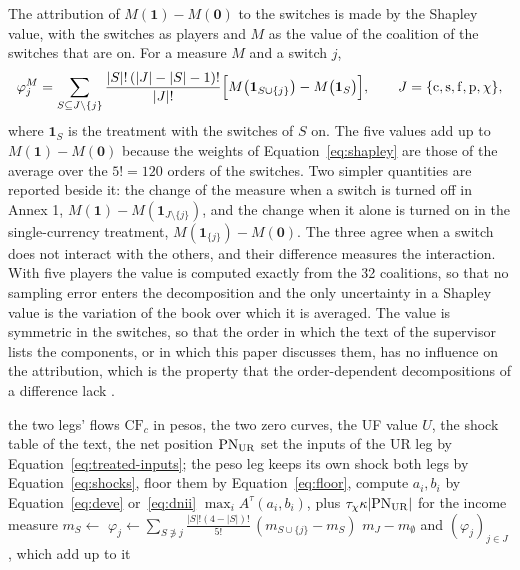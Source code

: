 The attribution of $M(\mathbf 1)-M(\mathbf 0)$ to the switches is made by the Shapley value, with the switches as players and $M$ as the value of the coalition of the switches that are on. For a measure $M$ and a switch $j$,
\begin{equation}
\varphi_j^{M}=\sum_{S\subseteq J\setminus\{j\}}\frac{|S|!\,(|J|-|S|-1)!}{|J|!}\Bigl[M\bigl(\mathbf 1_{S\cup\{j\}}\bigr)-M\bigl(\mathbf 1_{S}\bigr)\Bigr],\qquad J=\{\mathrm{c},\mathrm{s},\mathrm{f},\mathrm{p},\chi\},
\label{eq:shapley}
\end{equation}
where $\mathbf 1_S$ is the treatment with the switches of $S$ on. The five values add up to $M(\mathbf 1)-M(\mathbf 0)$ because the weights of Equation~\eqref{eq:shapley} are those of the average over the $5!=120$ orders of the switches. Two simpler quantities are reported beside it: the change of the measure when a switch is turned off in Annex 1, $M(\mathbf 1)-M(\mathbf 1_{J\setminus\{j\}})$, and the change when it alone is turned on in the single-currency treatment, $M(\mathbf 1_{\{j\}})-M(\mathbf 0)$. The three agree when a switch does not interact with the others, and their difference measures the interaction. With five players the value is computed exactly from the 32 coalitions, so that no sampling error enters the decomposition and the only uncertainty in a Shapley value is the variation of the book over which it is averaged. The value is symmetric in the switches, so that the order in which the text of the supervisor lists the components, or in which this paper discusses them, has no influence on the attribution, which is the property that the order-dependent decompositions of a difference lack \citep{Oaxaca1973}.

\begin{algorithm}[htbp]
\caption{The measure of a book under a treatment $\tau$, and the exact Shapley decomposition of the difference between Annex 1 and the single currency.}
\label{alg:shapley}
\begin{algorithmic}[1]
\Require the two legs' flows $\mathrm{CF}_c$ in pesos, the two zero curves, the UF value $U$, the shock table of the text, the net position $\mathrm{PN}_{\mathrm{UR}}$
  \State set the inputs of the UR leg by Equation~\eqref{eq:treated-inputs}; the peso leg keeps its own
    \State shock both legs by Equation~\eqref{eq:shocks}, floor them by Equation~\eqref{eq:floor}, compute $a_i,b_i$ by Equation~\eqref{eq:deve} or~\eqref{eq:dnii}
  \EndFor
  \State \Return $\max_i A^{\tau}(a_i,b_i)$, plus $\tau_\chi\kappa|\mathrm{PN}_{\mathrm{UR}}|$ for the income measure
\EndFunction
{} \State $m_S\gets$  \EndFor
{} \State $\varphi_j\gets\sum_{S\not\ni j}\frac{|S|!(4-|S|)!}{5!}\,(m_{S\cup\{j\}}-m_S)$ \EndFor
\State \Return $m_J-m_\emptyset$ and $(\varphi_j)_{j\in J}$, which add up to it
\end{algorithmic}
\end{algorithm}

